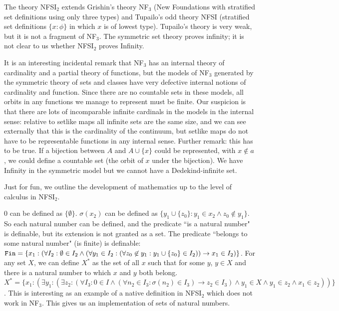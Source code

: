 \documentclass{article}
\begin{document}
\begin{description}
The theory NFSI$_2$ extends Grishin's theory NF$_3$ (New Foundations with stratified set definitions using only three types) and Tupailo's odd theory NFSI (stratified set definitions
$\{x : \phi\}$ in which $x$ is of lowest type).  Tupailo's theory is very weak, but it is not a fragment of NF$_3$.  The symmetric set theory proves infinity;  it is not clear to us whether
NFSI$_2$ proves Infinity.

It is an interesting incidental remark that NF$_3$ has an internal theory of cardinality and a partial theory of functions, but the models of NF$_3$ generated by the symmetric theory
of sets and classes have very defective internal notions of cardinality and function.  Since there are no countable sets in these models, all orbits in any functions we manage to represent must
be finite.  Our suspicion is that there are lots of incomparable infinite cardinals in the models in the internal sense:  relative to setlike maps all infinite sets are the same size, and we can see externally that this is the cardinality of the continuum, but setlike maps do not have to be representable functions in any internal sense.  Further remark:  this has to be true.  If a bijection between $A$ and
$A \cup \{x\}$ could be represented, with $x \not\in a$, we could define a countable set (the orbit of $x$ under the bijection).  We have Infinity in the symmetric model but
we cannot have a Dedekind-infinite set.

Just for fun, we outline the development of mathematics up to the level of calculus in NFSI$_2$.

0 can be defined as $\{\emptyset\}$.  $\sigma(x_2)$ can be defined as $\{y_1 \cup \{z_0\}:y_1 \in x_2 \wedge z_0 \not\in y_1\}$.  So each natural number can be defined, and the predicate ``is a natural number"
is definable, but its extension is not granted as a set.   The predicate ``belongs to some natural number" (is finite) is definable:  ${\tt Fin} = \{x_1:(\forall I_2:\emptyset \in I_2 \wedge (\forall y_1 \in I_2:(\forall z_0 \not\in y_1:y_1 \cup \{z_0\} \in I_2)) \rightarrow x_1 \in I_2)\}$.
 For any set $X$, we can define $X^*$ as the set of all $x$ such that for some $y$, $y \in X$ and there is a natural number to which $x$ and $y$ both belong.
$X^* = \{x_1:(\exists y_1:(\exists z_2:(\forall I_3:0 \in I \wedge (\forall n_2 \in I_3:\sigma(n_2) \in I_3) \rightarrow z_2 \in I_3) \wedge y_1 \in X \wedge y_1 \in z_2 \wedge x_1 \in z_2))\}$.  This is interesting as an example of a native definition in NFSI$_2$ which does not work in NF$_3$.  This gives us an implementation of sets of natural numbers.


\end{description}
\end{document}
